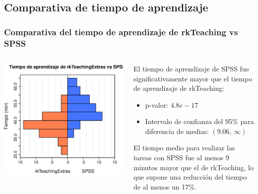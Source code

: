 \documentclass[mathserif,profesionalfont,10pt,dvips,xcolor=table]{beamer}
\theoremstyle{definition}
\begin{document}
\subsection{Comparativa de tiempo de aprendizaje}
\begin{frame}
\frametitle{Comparativa del tiempo de aprendizaje de rkTeaching vs SPSS}
\begin{columns}
\begin{column}{0.5\textwidth}
\begin{center}
\includegraphics[scale=0.5]{img/histograma_aprendizaje}
\end{center}
\end{column}
\begin{column}{0.45\textwidth}
El tiempo de aprendizaje de SPSS fue significativamente mayor que el tiempo de aprendizaje de rkTeaching:
\begin{itemize}
\item p-valor: $4.8e-17$
\item Intervalo de confianza del 95\% para diferencia de medias: $(9.06,\, \infty)$
\end{itemize}
El tiempo medio para realizar las tareas con SPSS fue al menos 9 minutos mayor que el de rkTeaching, lo que supone una reducción del tiempo de al menos un 17\%.
\end{column}
\end{columns}
\end{frame}
\end{document}
